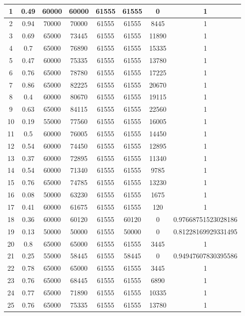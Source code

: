 \documentclass[10pt,a4paper,titlepage]{report}
\begin{document}
\begin{center}
\begin{table}
\begin{tabular}{ | c | c | c | c | c | c | c | c | }
		1 & 0.49 & 60000 & 60000 & 61555 & 61555 & 0 & 1 \\ \hline
		2 & 0.94 & 70000 & 70000 & 61555 & 61555 & 8445 & 1 \\ \hline
		3 & 0.69 & 65000 & 73445 & 61555 & 61555 & 11890 & 1 \\ \hline
		4 & 0.7 & 65000 & 76890 & 61555 & 61555 & 15335 & 1 \\ \hline
		5 & 0.47 & 60000 & 75335 & 61555 & 61555 & 13780 & 1 \\ \hline
		6 & 0.76 & 65000 & 78780 & 61555 & 61555 & 17225 & 1 \\ \hline
		7 & 0.86 & 65000 & 82225 & 61555 & 61555 & 20670 & 1 \\ \hline
		8 & 0.4 & 60000 & 80670 & 61555 & 61555 & 19115 & 1 \\ \hline
		9 & 0.63 & 65000 & 84115 & 61555 & 61555 & 22560 & 1 \\ \hline
		10 & 0.19 & 55000 & 77560 & 61555 & 61555 & 16005 & 1 \\ \hline
		11 & 0.5 & 60000 & 76005 & 61555 & 61555 & 14450 & 1 \\ \hline
		12 & 0.54 & 60000 & 74450 & 61555 & 61555 & 12895 & 1 \\ \hline
		13 & 0.37 & 60000 & 72895 & 61555 & 61555 & 11340 & 1 \\ \hline
		14 & 0.54 & 60000 & 71340 & 61555 & 61555 & 9785 & 1 \\ \hline
		15 & 0.76 & 65000 & 74785 & 61555 & 61555 & 13230 & 1 \\ \hline
		16 & 0.08 & 50000 & 63230 & 61555 & 61555 & 1675 & 1 \\ \hline
		17 & 0.41 & 60000 & 61675 & 61555 & 61555 & 120 & 1 \\ \hline
		18 & 0.36 & 60000 & 60120 & 61555 & 60120 & 0 & 0.97668751523028186 \\ \hline
		19 & 0.13 & 50000 & 50000 & 61555 & 50000 & 0 & 0.81228169929331495 \\ \hline
		20 & 0.8 & 65000 & 65000 & 61555 & 61555 & 3445 & 1 \\ \hline
		21 & 0.25 & 55000 & 58445 & 61555 & 58445 & 0 & 0.94947607830395586 \\ \hline
		22 & 0.78 & 65000 & 65000 & 61555 & 61555 & 3445 & 1 \\ \hline
		23 & 0.76 & 65000 & 68445 & 61555 & 61555 & 6890 & 1 \\ \hline
		24 & 0.77 & 65000 & 71890 & 61555 & 61555 & 10335 & 1 \\ \hline
		25 & 0.76 & 65000 & 75335 & 61555 & 61555 & 13780 & 1 \\ \hline

\end{tabular}
\end{table}
\end{center}
\end{document}
